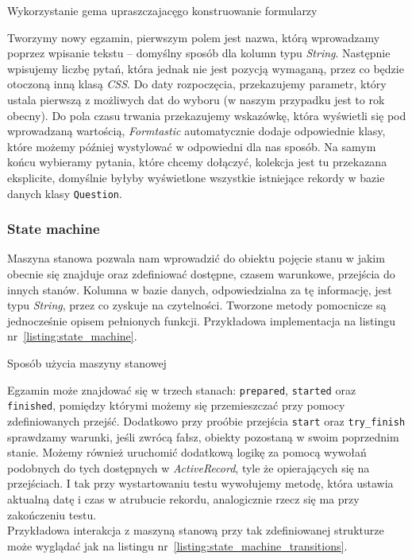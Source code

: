 \documentclass[a4paper,12pt]{article}
\begin{document}
\begin{listing}
  
  \caption{Wykorzystanie gema upraszczajacęgo konstruowanie formularzy}
  \label{listing:formtastic}
\end{listing}


Tworzymy nowy egzamin, pierwszym polem jest nazwa, którą wprowadzamy poprzez wpisanie
tekstu -- domyślny sposób dla kolumn typu \emph{String}. Następnie wpisujemy liczbę pytań,
która jednak nie jest pozycją wymaganą, przez co będzie otoczoną inną klasą \emph{CSS}.
Do daty rozpoczęcia, przekazujemy parametr, który ustala pierwszą z możliwych dat do
wyboru (w naszym przypadku jest to rok obecny). Do pola czasu trwania przekazujemy
wskazówkę, która wyświetli się pod wprowadzaną wartością, \emph{Formtastic} automatycznie
dodaje odpowiednie klasy, które możemy później wystylować w odpowiedni dla nas sposób. Na
samym końcu wybieramy pytania, które chcemy dołączyć, kolekcja jest tu przekazana
eksplicite, domyślnie byłyby wyświetlone wszystkie istniejące rekordy w bazie danych klasy
\texttt{Question}.

\subsubsection{State machine}\label{sec:state_machine}
Maszyna stanowa pozwala nam wprowadzić do obiektu pojęcie stanu w jakim obecnie się
znajduje oraz zdefiniować dostępne, czasem warunkowe, przejścia do innych stanów. Kolumna
w bazie danych, odpowiedzialna za tę informację, jest typu \emph{String}, przez co
zyskuje na czytelności. Tworzone metody pomocnicze są jednocześnie opisem pełnionych
funkcji. Przykładowa implementacja na listingu nr~\ref{listing:state_machine}.

\begin{listing}
  
  \caption{Sposób użycia maszyny stanowej}
  \label{listing:state_machine}
\end{listing}


Egzamin może znajdować się w trzech stanach: \texttt{prepared}, \texttt{started} oraz
\texttt{finished}, pomiędzy którymi możemy się przemieszczać przy pomocy zdefiniowanych
przejść. Dodatkowo przy proóbie przejścia \texttt{start} oraz \texttt{try\_finish}
sprawdzamy warunki, jeśli zwrócą fałsz, obiekty pozostaną w swoim poprzednim stanie.
Możemy również uruchomić dodatkową logikę za pomocą wywołań podobnych do tych dostępnych w
\emph{ActiveRecord}, tyle że opierających się na przejściach. I tak przy wystartowaniu
testu wywołujemy metodę, która ustawia aktualną datę i czas w atrubucie rekordu,
analogicznie rzecz się ma przy zakończeniu testu.\\
Przykładowa interakcja z maszyną stanową przy tak zdefiniowanej strukturze może wyglądać
jak na listingu nr~\ref{listing:state_machine_transitions}.
\end{document}
